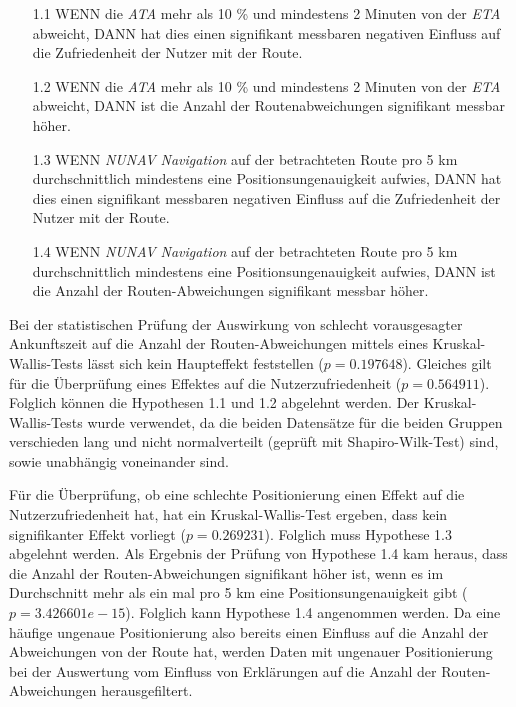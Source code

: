 \begin{enumerate}
    \item[1.1] WENN die \textit{ATA} mehr als 10 \% und mindestens 2 Minuten von der \textit{ETA} abweicht, DANN hat dies einen signifikant messbaren negativen Einfluss auf die Zufriedenheit der Nutzer mit der Route.
    \item[1.2] WENN die \textit{ATA} mehr als 10 \% und mindestens 2 Minuten von der \textit{ETA} abweicht, DANN ist die Anzahl der Routenabweichungen signifikant messbar höher.
    \item[1.3] WENN \textit{NUNAV Navigation} auf der betrachteten Route pro 5 km durchschnittlich mindestens eine Positionsungenauigkeit aufwies, DANN hat dies einen signifikant messbaren negativen Einfluss auf die Zufriedenheit der Nutzer mit der Route.
    \item[1.4] WENN \textit{NUNAV Navigation} auf der betrachteten Route pro 5 km durchschnittlich mindestens eine Positionsungenauigkeit aufwies, DANN ist die Anzahl der Routen-Abweichungen signifikant messbar höher.
\end{enumerate}

Bei der statistischen Prüfung der Auswirkung von schlecht vorausgesagter Ankunftszeit auf die Anzahl der Routen-Abweichungen mittels eines Kruskal-Wallis-Tests lässt sich kein Haupteffekt feststellen ($ p = 0.197648 $). Gleiches gilt für die Überprüfung eines Effektes auf die Nutzerzufriedenheit ($ p = 0.564911 $). Folglich können die Hypothesen 1.1 und 1.2 abgelehnt werden. Der Kruskal-Wallis-Tests wurde verwendet, da die beiden Datensätze für die beiden Gruppen verschieden lang und nicht normalverteilt (geprüft mit Shapiro-Wilk-Test) sind, sowie unabhängig voneinander sind.

Für die Überprüfung, ob eine schlechte Positionierung einen Effekt auf die Nutzerzufriedenheit hat, hat ein Kruskal-Wallis-Test ergeben, dass kein signifikanter Effekt vorliegt ($ p = 0.269231 $). Folglich muss Hypothese 1.3 abgelehnt werden. Als Ergebnis der Prüfung von Hypothese 1.4 kam heraus, dass die Anzahl der Routen-Abweichungen signifikant höher ist, wenn es im Durchschnitt mehr als ein mal pro 5 km eine Positionsungenauigkeit gibt ($ p = 3.426601e-15 $). Folglich kann Hypothese 1.4 angenommen werden. Da eine häufige ungenaue Positionierung also bereits einen Einfluss auf die Anzahl der Abweichungen von der Route hat, werden Daten mit ungenauer Positionierung bei der Auswertung vom Einfluss von Erklärungen auf die Anzahl der Routen-Abweichungen herausgefiltert.

